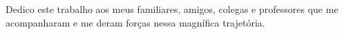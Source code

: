 \begin{dedicatoria}
    Dedico este trabalho aos meus familiares, amigos, colegas e professores que me acompanharam e me deram forças nessa magnífica trajetória.
\end{dedicatoria}
